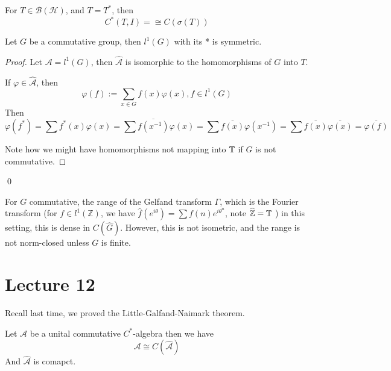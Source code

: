 For $T\in\mathcal{B}(\mathcal{H})$, and $T=T^*$, then
\begin{equation*}
    C^*(T,I)=\cong C(\sigma(T))
\end{equation*}

\begin{proposition}
    Let $G$ be a commutative group, then $l^1(G)$ with its * is symmetric.
\end{proposition}
\begin{proof}
    Let $\mathcal{A}=l^1(G)$, then $\widehat{\mathcal{A}}$ is isomorphic to the homomorphisms of $G$ into $T$.

    If $\varphi\in\widehat{\mathcal{A}}$, then
    \begin{equation*}
        \varphi(f):=\sum_{x\in G} f(x)\varphi(x), f\in l^1(G)
    \end{equation*}
    Then \begin{equation*}
        \varphi(f^*)=\sum f^*(x)\varphi(x)=\sum\overline{f(x^{-1})}\varphi(x)=\sum\overline{f(x)}\varphi(x^{-1})=\sum\overline{f(x)}\overline{\varphi(x)}=\overline{\varphi(f)}
    \end{equation*}

    Note how we might have homomorphisms not mapping into $\mathbb{T}$ if $G$ is not commutative.
\end{proof}
\qed

\begin{proposition}
    For $G$ commutative, the range of the Gelfand transform $\Gamma$, which is the Fourier transform (for $f\in l^1(\mathbb{Z})$, we have $\widehat{f}(e^{i\theta})=\sum f(n)e^{{i\theta}^n}$, note $\widehat{\mathbb{Z}}=\mathbb{T}$ ) in this setting, this is dense in $C(\widehat{G})$. However, this is not isometric, and the range is not norm-closed unless $G$ is finite.
\end{proposition}



\section{Lecture 12}
Recall last time, we proved the Little-Galfand-Naimark theorem.
\begin{theorem}
    Let $\mathcal{A}$ be a unital commutative $C^*$-algebra then we have
    \begin{equation*}
        \mathcal{A}\cong C(\widehat{\mathcal{A}})
    \end{equation*}
    And $\widehat{\mathcal{A}}$ is comapct. 
\end{theorem}

